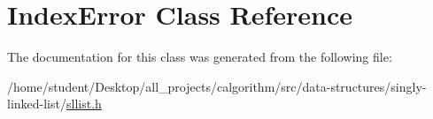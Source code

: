 \hypertarget{classIndexError}{}\section{Index\+Error Class Reference}
\label{classIndexError}


The documentation for this class was generated from the following file\+:\begin{DoxyCompactItemize}
\item 
/home/student/\+Desktop/all\+\_\+projects/calgorithm/src/data-\/structures/singly-\/linked-\/list/\mbox{\hyperlink{sllist_8h}{sllist.\+h}}\end{DoxyCompactItemize}
